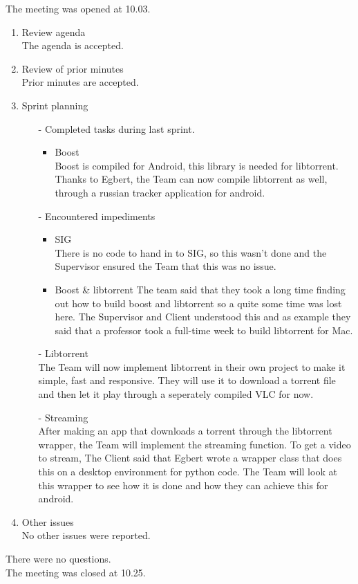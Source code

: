 \documentclass[pdftex, 12pt, a4paper]{report}
\begin{document}
\pagestyle{fancy}

The meeting was opened at 10.03.\\

\begin{enumerate}
\item Review agenda\\	
The agenda is accepted.
\item Review of prior minutes\\
Prior minutes are accepted.
\item Sprint planning\\
\begin{enumerate}
\item[-] Completed tasks during last sprint.\\
	\begin{itemize}
	\item Boost\\
Boost is compiled for Android, this library is needed for libtorrent.
Thanks to Egbert, the Team can now compile libtorrent as well, through a russian tracker application for android.
	\end{itemize}
\item[-] Encountered impediments\\
	\begin{itemize}
	\item SIG\\
There is no code to hand in to SIG, so this wasn't done and the Supervisor ensured the Team that this was no issue.
	\item Boost \& libtorrent
The team said that they took a long time finding out how to build boost and libtorrent so a quite some time was lost here. The Supervisor and Client understood this and as example they said that a professor took a full-time week to build libtorrent for Mac.
	\end{itemize}
\item[-] Libtorrent\\
The Team will now implement libtorrent in their own project to make it simple, fast and responsive. They will use it to download a torrent file and then let it play through a seperately compiled VLC for now.
\item[-] Streaming\\
After making an app that downloads a torrent through the libtorrent wrapper, the Team will implement the streaming function. To get a video to stream, The Client said that Egbert wrote a wrapper class that does this on a desktop environment for python code. The Team will look at this wrapper to see how it is done and how they can achieve this for android.
\end{enumerate}
\item Other issues\\
No other issues were reported.
\end{enumerate}

There were no questions.\\

The meeting was closed at 10.25.\\
\end{document}
